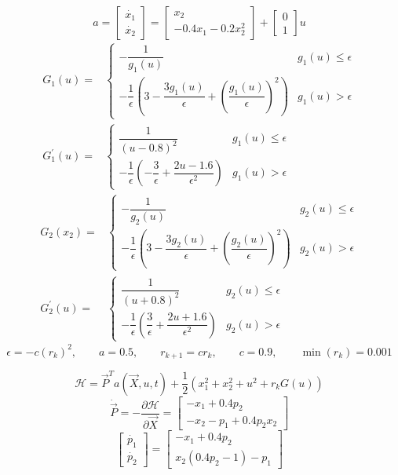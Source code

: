 $$
a = \begin{bmatrix}
	\dot{x_1}\\
	\dot{x_2}
\end{bmatrix} = \begin{bmatrix}
	x_2\\
	-0.4x_1 -0.2x_2^2
\end{bmatrix} + \begin{bmatrix}
	0\\
	1
\end{bmatrix}u
$$
\begin{align*}
	G_1(u) = &
	\begin{cases}
		-\dfrac{1}{g_1(u)}&  g_1(u) \leq \epsilon \\[1em]
		-\dfrac{1}{\epsilon}\left(3 - \dfrac{3g_1(u)}{\epsilon} + \left(\dfrac{g_1(u)}{\epsilon}\right)^2\right) &  g_1(u) > \epsilon
	\end{cases} \\
	G_1^\prime(u) = &
	\begin{cases}
		\dfrac{1}{(u - 0.8)^2}&  g_1(u) \leq \epsilon \\[1em]
		-\dfrac{1}{\epsilon}\left(-\dfrac{3}{\epsilon} + \dfrac{2u-1.6}{\epsilon^2} \right) &  g_1(u) > \epsilon
	\end{cases} 
\end{align*}
\begin{align*}
	G_2(x_2) = &
	\begin{cases}
		-\dfrac{1}{g_2(u)}&  g_2(u) \leq \epsilon \\[1em]
		-\dfrac{1}{\epsilon}\left(3 - \dfrac{3g_2(u)}{\epsilon} + \left(\dfrac{g_2(u)}{\epsilon}\right)^2\right) &  g_2(u) > \epsilon
	\end{cases} \\
	G_2^\prime(u) = &
	\begin{cases}
		\dfrac{1}{(u + 0.8)^2}&  g_2(u) \leq \epsilon \\[1em]
		-\dfrac{1}{\epsilon}\left(\dfrac{3}{\epsilon} + \dfrac{2u+1.6}{\epsilon^2} \right) &  g_2(u) > \epsilon
	\end{cases} 
\end{align*}
$$
\epsilon = -c\left(r_k\right)^2,\qquad a = 0.5,\qquad r_{k+1} = cr_k,\qquad c = 0.9,
\qquad \min (r_k) = 0.001
$$



$$
\mathcal{H} = \vec{P}^Ta(\vec{X}, u, t) + \frac12\left(x_1^2 + x_2^2 + u^2 + r_kG(u) \right)
$$
 $$\dot{\vec{P}} = -\dfrac{\partial \mathcal{H}}{\partial \vec{X}} = \begin{bmatrix}
	-x_1 + 0.4p_2 \\
	-x_2  - p_1 + 0.4 p_2x_2 
\end{bmatrix}$$
$$\begin{bmatrix}
	\dot{p_1}\\
	\dot{p_2}
\end{bmatrix} = \begin{bmatrix}
	-x_1 + 0.4p_2 \\
	x_2(0.4 p_2-1)  - p_1
\end{bmatrix}$$